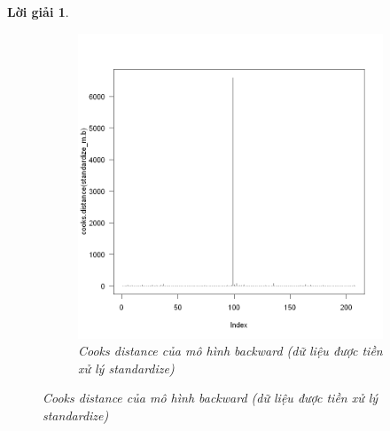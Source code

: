 \documentclass[14pt, a4paper]{article}
\theoremstyle{sltheorem}
\theoremstyle{soltheorem}
\newtheorem*{loigiai}{Lời giải}
\begin{document}
\begin{loigiai}
\begin{figure}[h!]
\begin{subfigure}[b]{0.4\textwidth}
            \includegraphics[width=\textwidth]{figures/standardize_mb_cooks.png}
            \caption{Cooks distance của mô hình backward (dữ liệu được tiền xử lý standardize)}
        \end{subfigure}
        \label{fig:Cooks-distance-mb}
    \end{figure}


\end{loigiai}
\end{document}
